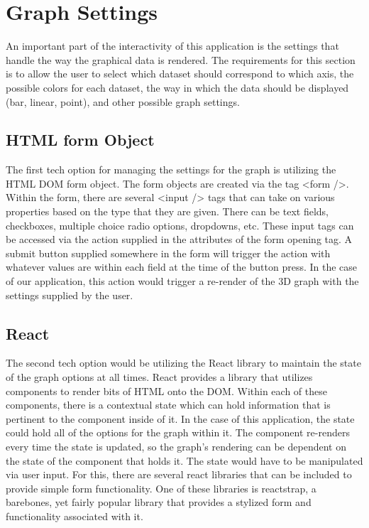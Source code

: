 \documentclass[journal,10pt,onecolumn,compsoc]{IEEEtran}
\begin{document}
\section {Graph Settings}
An important part of the interactivity of this application is the settings that handle the way the graphical data is rendered. The requirements for this section is to allow the user to select which dataset should correspond to which axis, the possible colors for each dataset, the way in which the data should be displayed (bar, linear, point), and other possible graph settings.

\subsection{HTML form Object}
The first tech option for managing the settings for the graph is utilizing the HTML DOM form object. The form objects are created via the tag <form />. Within the form, there are several <input /> tags that can take on various properties based on the type that they are given. There can be text fields, checkboxes, multiple choice radio options, dropdowns, etc. These input tags can be accessed via the action supplied in the attributes of the form opening tag. A submit button supplied somewhere in the form will trigger the action with whatever values are within each field at the time of the button press. In the case of our application, this action would trigger a re-render of the 3D graph with the settings supplied by the user.

\subsection{React}
The second tech option would be utilizing the React library to maintain the state of the graph options at all times. React provides a library that utilizes components to render bits of HTML onto the DOM. Within each of these components, there is a contextual state which can hold information that is pertinent to the component inside of it. In the case of this application, the state could hold all of the options for the graph within it. The component re-renders every time the state is updated, so the graph’s rendering can be dependent on the state of the component that holds it. The state would have to be manipulated via user input. For this, there are several react libraries that can be included to provide simple form functionality. One of these libraries is reactstrap, a barebones, yet fairly popular library that provides a stylized form and functionality associated with it.
\end{document}
